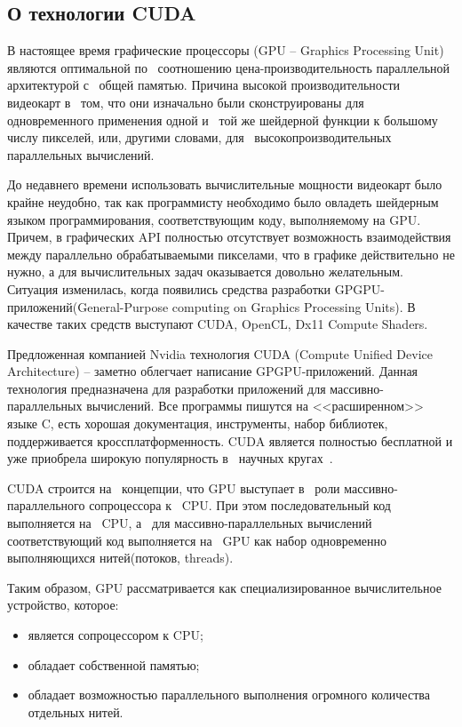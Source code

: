 \subsection{О технологии CUDA}
В настоящее время графические процессоры (GPU -- Graphics Processing Unit)
являются оптимальной по~ соотношению цена-производительность параллельной 
архитектурой с~ общей памятью. Причина высокой производительности видеокарт 
в~ том, что они изначально были сконструированы для~ одновременного применения
одной и~ той же шейдерной функции к большому числу пикселей, или, другими 
словами, для~ высокопроизводительных параллельных вычислений.

До недавнего времени использовать вычислительные мощности видеокарт было
крайне неудобно, так как программисту необходимо было
овладеть шейдерным языком программирования, соответствующим коду,
выполняемому на GPU. Причем, в графических API полностью отсутствует
возможность взаимодействия между параллельно обрабатываемыми пикселами,
что в графике действительно не нужно, а для вычислительных задач оказывается довольно
желательным. Ситуация изменилась, когда появились средства разработки
GPGPU-приложений(General-Purpose computing on Graphics Processing Units). 
В качестве таких средств выступают CUDA, OpenCL, Dx11 Compute
Shaders. 

Предложенная компанией Nvidia технология CUDA (Compute Unified Device Architecture) -- 
заметно облегчает написание GPGPU-приложений. Данная технология предназначена для
разработки приложений для массивно-параллельных вычислений. Все программы пишутся на
<<расширенном>> языке C, есть хорошая документация, инструменты, набор библиотек,
поддерживается кроссплатформенность. CUDA является полностью бесплатной и уже 
приобрела широкую популярность в~ научных кругах~\cite{Boreskov}.

CUDA строится на~ концепции, что GPU выступает в~ роли массивно-параллельного
сопроцессора к~ CPU. При этом последовательный код выполняется на~ CPU,
а~ для массивно-параллельных вычислений соответствующий код выполняется на~
GPU как набор одновременно выполняющихся нитей(потоков, threads).

Таким образом, GPU рассматривается как специализированное вычислительное устройство,
которое:
\begin{itemize}
  \item является сопроцессором к CPU;
  \item обладает собственной памятью;
  \item обладает возможностью параллельного выполнения огромного количества отдельных
  нитей.
\end{itemize}

